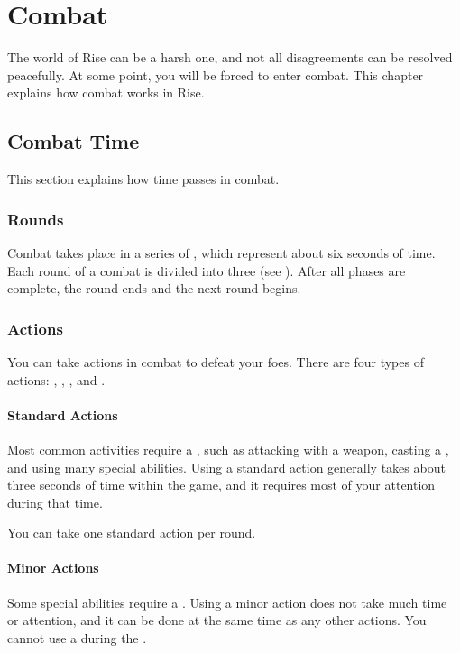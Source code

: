 \chapter{Combat}\label{Combat}
    The world of Rise can be a harsh one, and not all disagreements can be resolved peacefully.
    At some point, you will be forced to enter combat.
    This chapter explains how combat works in Rise.

\section{Combat Time}\label{Combat Time}
    This section explains how time passes in combat.

    \subsection{Rounds}\label{Rounds}

        Combat takes place in a series of , which represent about six seconds of time.
        Each round of a combat is divided into three  (see ).
        After all phases are complete, the round ends and the next round begins.

    \subsection{Actions}\label{Actions}

        You can take actions in combat to defeat your foes.
        There are four types of actions: , , , and .

        \subsubsection{Standard Actions}\label{Standard Actions}
            Most common activities require a , such as attacking with a weapon, casting a , and using many special abilities.
            Using a standard action generally takes about three seconds of time within the game, and it requires most of your attention during that time.

            You can take one standard action per round.

        \subsubsection{Minor Actions}\label{Minor Actions}
            Some special abilities require a .
            Using a minor action does not take much time or attention, and it can be done at the same time as any other actions.
            You cannot use a  during the .

